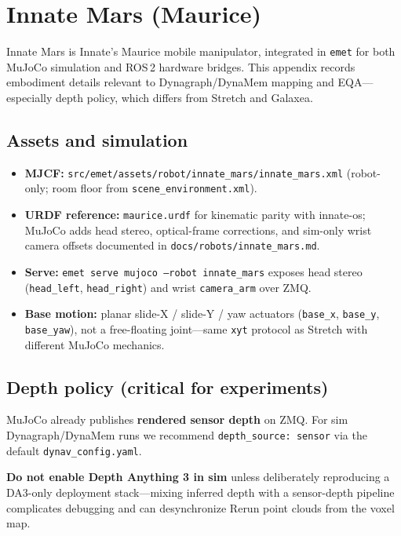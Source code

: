 \section{Innate Mars (Maurice)}
\label{app:innate_mars}

Innate Mars is Innate's Maurice mobile manipulator, integrated in \texttt{emet} for both MuJoCo simulation and ROS\,2 hardware bridges.
This appendix records embodiment details relevant to Dynagraph/DynaMem mapping and EQA---especially depth policy, which differs from Stretch and Galaxea.

\subsection{Assets and simulation}

\begin{itemize}
  \item \textbf{MJCF:} \texttt{src/emet/assets/robot/innate\_mars/innate\_mars.xml} (robot-only; room floor from \texttt{scene\_environment.xml}).
  \item \textbf{URDF reference:} \texttt{maurice.urdf} for kinematic parity with innate-os; MuJoCo adds head stereo, optical-frame corrections, and sim-only wrist camera offsets documented in \texttt{docs/robots/innate\_mars.md}.
  \item \textbf{Serve:} \texttt{emet serve mujoco --robot innate\_mars} exposes head stereo (\texttt{head\_left}, \texttt{head\_right}) and wrist \texttt{camera\_arm} over ZMQ.
  \item \textbf{Base motion:} planar slide-X / slide-Y / yaw actuators (\texttt{base\_x}, \texttt{base\_y}, \texttt{base\_yaw}), not a free-floating joint---same \texttt{xyt} protocol as Stretch with different MuJoCo mechanics.
\end{itemize}

\subsection{Depth policy (critical for experiments)}

MuJoCo already publishes \textbf{rendered sensor depth} on ZMQ.
For sim Dynagraph/DynaMem runs we recommend \texttt{depth\_source: sensor} via the default \texttt{dynav\_config.yaml}.

\textbf{Do not enable Depth Anything 3 in sim} unless deliberately reproducing a DA3-only deployment stack---mixing inferred depth with a sensor-depth pipeline complicates debugging and can desynchronize Rerun point clouds from the voxel map.

